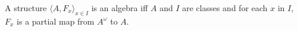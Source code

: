 A structure $\langle A, F_x \rangle_{x \in I}$ is an algebra iff $A$ and $I$ are classes and for each $x$ in $I$, $F_x$ is a partial map from $A^\omega$ to $A$.
